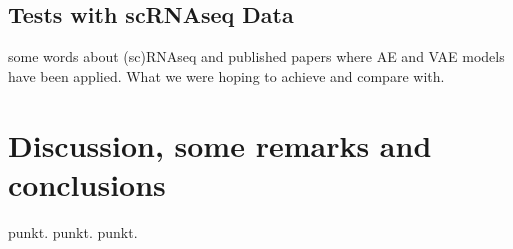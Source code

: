 \documentclass[11pt, a4paper]{report}
\theoremstyle{plain}
\theoremstyle{definition}
\theoremstyle{remark}
\begin{document}
\section{Tests with scRNAseq Data}
some words about (sc)RNAseq and published papers where 
AE and VAE models have been applied.
What we were hoping to achieve and compare with.

\chapter{Discussion, some remarks and conclusions}
punkt.
punkt.
punkt.







\printbibliography
\end{document}
